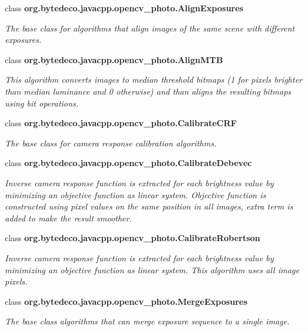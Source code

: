 \begin{DoxyCompactItemize}
class {\bfseries org.\+bytedeco.\+javacpp.\+opencv\+\_\+photo.\+Align\+Exposures}
\begin{DoxyCompactList}\small\item\em The base class for algorithms that align images of the same scene with different exposures. \end{DoxyCompactList}\item 
class {\bfseries org.\+bytedeco.\+javacpp.\+opencv\+\_\+photo.\+Align\+M\+TB}
\begin{DoxyCompactList}\small\item\em This algorithm converts images to median threshold bitmaps (1 for pixels brighter than median luminance and 0 otherwise) and than aligns the resulting bitmaps using bit operations. \end{DoxyCompactList}\item 
class {\bfseries org.\+bytedeco.\+javacpp.\+opencv\+\_\+photo.\+Calibrate\+C\+RF}
\begin{DoxyCompactList}\small\item\em The base class for camera response calibration algorithms. \end{DoxyCompactList}\item 
class {\bfseries org.\+bytedeco.\+javacpp.\+opencv\+\_\+photo.\+Calibrate\+Debevec}
\begin{DoxyCompactList}\small\item\em Inverse camera response function is extracted for each brightness value by minimizing an objective function as linear system. Objective function is constructed using pixel values on the same position in all images, extra term is added to make the result smoother. \end{DoxyCompactList}\item 
class {\bfseries org.\+bytedeco.\+javacpp.\+opencv\+\_\+photo.\+Calibrate\+Robertson}
\begin{DoxyCompactList}\small\item\em Inverse camera response function is extracted for each brightness value by minimizing an objective function as linear system. This algorithm uses all image pixels. \end{DoxyCompactList}\item 
class {\bfseries org.\+bytedeco.\+javacpp.\+opencv\+\_\+photo.\+Merge\+Exposures}
\begin{DoxyCompactList}\small\item\em The base class algorithms that can merge exposure sequence to a single image. \end{DoxyCompactList}\item 

\end{DoxyCompactItemize}
